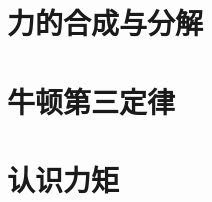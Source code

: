 \documentclass[color=purple,openany]{textbook-cn}
\begin{document}
\section{力的合成与分解}

\begin{Point}
\lipsum[2]
\end{Point}

\begin{Case}
\item \lipsum[1][3]
\item \lipsum[1][3]
\item \lipsum[1][3]
\item \lipsum[1][3]
\end{Case}

\begin{Link}
\zhlipsum[1]
\end{Link}



\section{牛顿第三定律}

\begin{Point}
\lipsum[2]
\end{Point}

\begin{Case}
\item \lipsum[1][3]
\item \lipsum[1][3]
\item \lipsum[1][3]
\item \lipsum[1][3]
\end{Case}

\begin{Link}
\zhlipsum[1]
\end{Link}







\section{认识力矩}

\begin{Point}
\lipsum[2]
\end{Point}

\begin{Case}
\item \lipsum[1][3]
\item \lipsum[1][3]
\item \lipsum[1][3]
\item \lipsum[1][3]
\end{Case}
\end{document}
